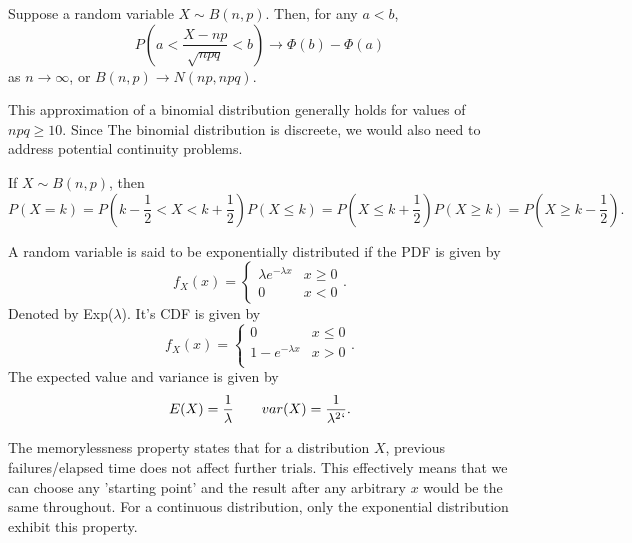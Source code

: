 \documentclass[5pt, a4paper]{article}
\begin{document}
    \begin{tcolorbox}[title=de Moivre-Laplace Theorem]
        Suppose a random variable $X \sim B(n,p)$. Then, for any $a < b$,  \[
        P\left( a < \frac{X - np}{\sqrt{npq}  } < b\right)  \to \Phi (b) -
        \Phi (a)
        \] 
        as $n \to \infty$, or $B(n,p) \to  N(np,npq)$. 
    \end{tcolorbox}
    \begin{tcolorbox}[colframe=blue!20!white]
        This approximation of a binomial distribution generally holds for values
        of $npq \ge 10$. Since The binomial distribution is discreete, we would
        also need to address potential continuity problems.
    \end{tcolorbox}
    \begin{tcolorbox}[title=Continuity Correction, colframe=blue!20!white]
        If $X \sim B(n,p)$, then \[
        P(X = k) = P(k - \frac{1}{2} < X < k + \frac{1}{2})
        P(X \le k) = P(X \le  k +\frac{1}{2})
        P(X \ge k) = P(X \ge k -\frac{1}{2})
        .\] 
    \end{tcolorbox}
    \begin{tcolorbox}[title=Exponential Distribution]
        A random variable is said to be exponentially distributed if the PDF is
        given by \[
        f_X(x) = \begin{cases}
            \lambda e^{-\lambda x} & x \ge 0 \\
            0 & x < 0
        \end{cases}
        .\] 
        Denoted by Exp($\lambda$). It's CDF is given by \[
        f_X(x) = \begin{cases}
            0 & x \le 0 \\
            1 - e^{-\lambda x} & x > 0 \\
        \end{cases}
        .\]  The expected value and variance is given by \[
        E(X) = \frac{1}{\lambda} \qquad var(X) = \frac{1}{\lambda^2`}
        .\] 

    \end{tcolorbox}
    \begin{tcolorbox}[title=Memorylessness Property, colframe=blue!20!white]
        The memorylessness property states that for a distribution $X$, previous
        failures/elapsed time does not affect further trials. This effectively
        means that we can choose any 'starting point' and the result after any
        arbitrary $x$ would be the same throughout. For a continuous
        distribution, only the exponential distribution exhibit this property.
    \end{tcolorbox}
\end{document}

